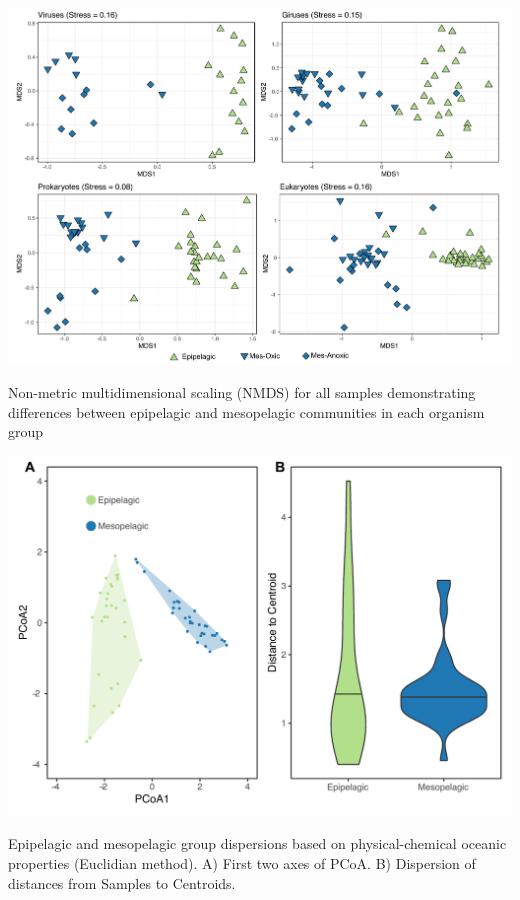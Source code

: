 \documentclass[fleqn,10pt]{wlscirep}
\begin{document}
\begin{suppfigure}[ht]
    \centering
    \includegraphics[scale=0.4]{images/nmds_used_SF_to_print.pdf}
    \caption{Non-metric multidimensional scaling (NMDS) for all samples demonstrating differences between epipelagic and mesopelagic communities in each organism group}
    \label{fig:nmds}
\end{suppfigure}
\begin{suppfigure}[ht]
    \centering
    \includegraphics[scale=0.5]{images/betadisp_diganose_to_print.pdf}
    \caption{Epipelagic and mesopelagic group dispersions based on physical-chemical oceanic properties (Euclidian method). A) First two axes of PCoA. B) Dispersion of distances from Samples to Centroids.}
    \label{fig:betadipersion}
\end{suppfigure}
\end{document}
